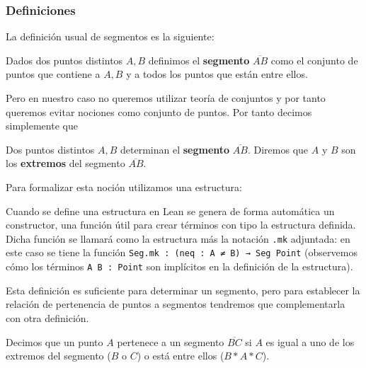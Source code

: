 
\subsubsection{Definiciones}\label{ssec:definiciones_orden}

La definición usual de segmentos es la siguiente:

\begin{defin*}[Segmentos]
	Dados dos puntos distintos $A, B$ definimos el \textbf{segmento}
	$\overline{AB}$ como el conjunto de puntos que contiene a $A, B$ y a todos los
	puntos que están entre ellos.
\end{defin*}

Pero en nuestro caso no queremos utilizar teoría de conjuntos y por tanto
queremos evitar nociones como \guillemotleft conjunto de puntos\guillemotright.
Por tanto decimos simplemente que

\begin{defin*}[Segmentos]
	Dos puntos distintos $A, B$ determinan el \textbf{segmento} $\overline{AB}$.
	Diremos que $A$ y $B$ son los \textbf{extremos} del segmento $\overline{AB}$.
\end{defin*}

Para formalizar esta noción utilizamos una estructura:


Cuando se define una estructura en Lean se genera de forma automática
un constructor, una función útil para crear términos con tipo la estructura
definida. Dicha función se llamará como la estructura más la notación
\lstinline{.mk} adjuntada: en este caso se tiene la función
\lstinline{Seg.mk : (neq : A ≠ B) → Seg Point} (observemos cómo los términos
\lstinline{A B : Point} son implícitos en la definición de la estructura).

Esta definición es suficiente para determinar un segmento, pero para establecer
la relación de pertenencia de puntos a segmentos tendremos que complementarla
con otra definición.

\begin{defin*}
	Decimos que un punto $A$ pertenece a un segmento $\overline{BC}$ si $A$ es
	igual a uno de los extremos del segmento ($B$ o $C$) o está entre ellos
	($B * A * C$).
\end{defin*}


